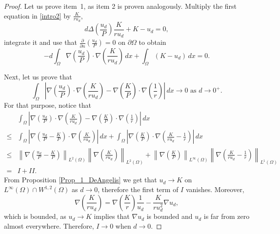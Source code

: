 \documentclass[11pt]{article}
\newcommand{\norm}[1]{\left\|#1\right\|}
\newcommand{\parentheses}[1]{\left(#1\right)}
\newcommand{\module}[1]{\left|#1\right|}
\theoremstyle{definition}
\theoremstyle{remark}
\begin{document}
\begin{proof}
        Let us prove item~1, as item 2 is proven analogously. Multiply the first equation in  \eqref{intro2} by $\frac{K}{ru_d}$,
        \begin{equation*}
            d\Delta\parentheses{\frac{u_d}{P}}\frac{K}{ru_d}+K-u_d=0,
        \end{equation*}
        integrate it and use that $\frac{\partial}{\partial n}(\frac{u_d}{P})=0$ on $\partial\Omega$ to obtain
        \begin{equation}\label{Eq.1 Feb14th}
            -d\int_\Omega\nabla\parentheses{\frac{u_d}{P}}\cdot\nabla\parentheses{\frac{K}{ru_d}}\,dx+\int_\Omega(K-u_d)\,dx=0.
        \end{equation}
        
        Next, let us prove that
        \begin{equation*}
            \int_\Omega\module{\nabla\parentheses{\frac{u_d}{P}}\cdot\nabla\parentheses{\frac{K}{ru_d}}-\nabla\parentheses{\frac{K}{P}}\cdot\nabla\parentheses{\frac{1}{r}}}\,dx\to0 \textrm{ as } d\to0^+. 
        \end{equation*}
        For that purpose, notice that 
        \begin{align*}
            &\int_\Omega\module{\nabla\parentheses{\frac{u_d}{P}}\cdot\nabla\parentheses{\frac{K}{ru_d}}-\nabla\parentheses{\frac{K}{P}}\cdot\nabla\parentheses{\frac{1}{r}}}\,dx\\
            \leq&\int_\Omega\module{\nabla\parentheses{\frac{u_d}{P}-\frac{K}{P}}\cdot\nabla\parentheses{\frac{K}{ru_d}} }\,dx+\int_\Omega\module{\nabla\parentheses{\frac{K}{P}}\cdot\nabla\parentheses{\frac{K}{ru_d} -\frac{1}{r}}  }\,dx\\
            \leq&\norm{\nabla\parentheses{\frac{u_d}{P}-\frac{K}{P}}}_{L^2(\Omega)}\norm{\nabla\parentheses{\frac{K}{ru_d}}}_{L^2(\Omega)}+\norm{\nabla\parentheses{\frac{K}{P}}}_{L^\infty(\Omega)}\norm{\nabla\parentheses{\frac{K}{ru_d}-\frac{1}{r}}}_{L^1(\Omega)}\\
            =&I+II.
        \end{align*}
    From Proposition \ref{Prop_1_DeAngelis} we get that $u_d\to K$ on $L^\infty(\Omega)\cap W^{1,2}(\Omega)$ as $d\to0$, therefore the first term of $I$ vanishes. Moreover,
    \begin{equation*}
        \nabla\parentheses{\frac{K}{ru_d}}=\nabla\parentheses{\frac{K}{r}}\frac{1}{u_d}-\frac{K}{ru_d^2}\nabla u_d,
    \end{equation*}
    which is bounded, as $u_d\to K$ implies that $\nabla u_d$ is bounded and $u_d$ is far from zero almost everywhere. Therefore, $I\to0$ when $d\to0$.



\end{proof}
\end{document}
